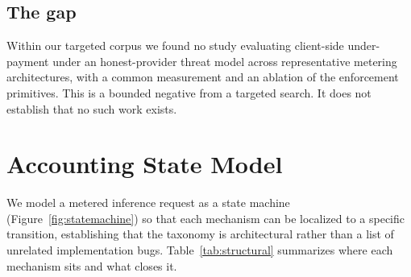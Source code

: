 \documentclass[final,5p,times,twocolumn,number]{elsarticle}
\begin{document}
\subsection{The gap}
Within our targeted corpus we found no study evaluating client-side under-payment under
an honest-provider threat model across representative metering architectures, with a
common measurement and an ablation of the enforcement primitives. This is a bounded
negative from a targeted search. It does not establish that no such work exists.

\section{Accounting State Model}
\label{sec:statemodel}
We model a metered inference request as a state machine (Figure~\ref{fig:statemachine})
so that each mechanism can be localized to a specific transition, establishing that the
taxonomy is architectural rather than a list of unrelated implementation bugs.
Table~\ref{tab:structural} summarizes where each mechanism sits and what closes it.
\end{document}
